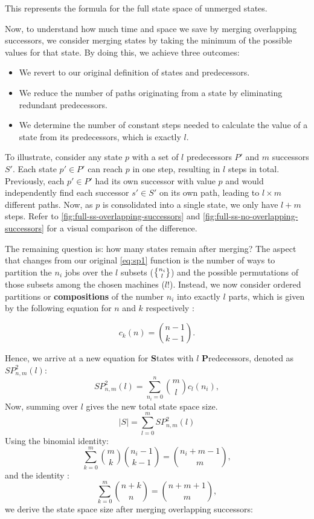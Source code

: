 This represents the formula for the full state space of unmerged states.

Now, to understand how much time and space we save by merging overlapping successors, we consider merging states by taking the minimum of the possible values for that state. By doing this, we achieve three outcomes:
\begin{itemize}
    \item We revert to our original definition of states and predecessors.
    \item We reduce the number of paths originating from a state by eliminating redundant predecessors.
    \item We determine the number of constant steps needed to calculate the value of a state from its predecessors, which is exactly $l$.
\end{itemize}

To illustrate, consider any state $p$ with a set of $l$ predecessors $P'$ and $m$ successors $S'$. Each state $p' \in P'$ can reach $p$ in one step, resulting in $l$ steps in total. Previously, each $p' \in P'$ had its own successor with value $p$ and would independently find each successor $s' \in S'$ on its own path, leading to $l \times m$ different paths. Now, as $p$ is consolidated into a single state, we only have $l + m$ steps. Refer to \autoref{fig:full-ss-overlapping-successors} and \autoref{fig:full-ss-no-overlapping-successors} for a visual comparison of the difference.

The remaining question is: how many states remain after merging? The aspect that changes from our original \eqref{eq:sp1} function is the number of ways to partition the $n_i$ jobs over the $l$ subsets ($\stirlingS{n_i}{l}$) and the possible permutations of those subsets among the chosen machines ($l!$). Instead, we now consider ordered partitions or \textbf{compositions} of the number $n_i$ into exactly $l$ parts, which is given by the following equation for $n$ and $k$ respectively \cite{k-compositions}:

\[
    c_k(n) = \binom{n-1}{k-1}.
\]

Hence, we arrive at a new equation for \textbf{S}tates with $l$ \textbf{P}redecessors, denoted as $SP^2_{n,m}(l)$:
\begin{equation}
    SP^2_{n,m}(l) = \sum_{n_i=0}^{n} \binom{m}{l} c_l(n_i),
    \label{eq:sp2}
\end{equation}
Now, summing over $l$ gives the new total state space size.
\[
    |S| = \sum_{l=0}^m SP^2_{n,m}(l)
\]
Using the binomial identity:
\begin{equation}
    \sum_{k=0}^m \binom{m}{k} \binom{n_i - 1}{k - 1} = \binom{n_i + m - 1}{m},
    \label{eq:bin-id-1}
\end{equation}
and the identity \cite{spiegel1968mathhandbook}:
\[
    \sum_{k=0}^m \binom{n + k}{n} = \binom{n + m + 1}{m},
\]
we derive the state space size after merging overlapping successors:

